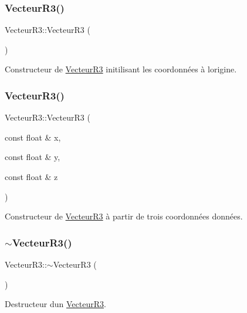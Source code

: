 \subsubsection{\texorpdfstring{Vecteur\+R3()}{VecteurR3()}\hspace{0.1cm}{\footnotesize\ttfamily [1/2]}}
{\footnotesize\ttfamily Vecteur\+R3\+::\+Vecteur\+R3 (\begin{DoxyParamCaption}{ }\end{DoxyParamCaption})}

Constructeur de \mbox{\hyperlink{class_vecteur_r3}{Vecteur\+R3}} initilisant les coordonnées à l\textquotesingle{}origine. \mbox{\label{class_vecteur_r3_a86df8062a0522098bac7c2f18e97f2a3}} 
\subsubsection{\texorpdfstring{Vecteur\+R3()}{VecteurR3()}\hspace{0.1cm}{\footnotesize\ttfamily [2/2]}}
{\footnotesize\ttfamily Vecteur\+R3\+::\+Vecteur\+R3 (\begin{DoxyParamCaption}\item[{const float \&}]{x,  }\item[{const float \&}]{y,  }\item[{const float \&}]{z }\end{DoxyParamCaption})}

Constructeur de \mbox{\hyperlink{class_vecteur_r3}{Vecteur\+R3}} à partir de trois coordonnées données. \mbox{\label{class_vecteur_r3_a75a59c365109680a59e84db71faf8eb9}} 
\subsubsection{\texorpdfstring{$\sim$\+Vecteur\+R3()}{~VecteurR3()}}
{\footnotesize\ttfamily Vecteur\+R3\+::$\sim$\+Vecteur\+R3 (\begin{DoxyParamCaption}{ }\end{DoxyParamCaption})\hspace{0.3cm}{\ttfamily [virtual]}}

Destructeur d\textquotesingle{}un \mbox{\hyperlink{class_vecteur_r3}{Vecteur\+R3}}. 

